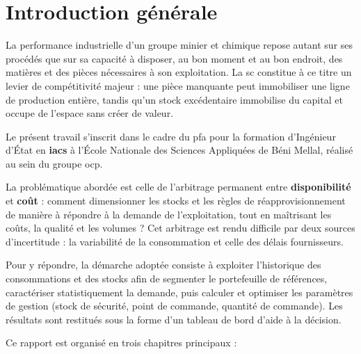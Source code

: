 \chapter*{Introduction générale}

\hspace{1cm}La performance industrielle d'un groupe minier et chimique repose
autant sur ses procédés que sur sa capacité à disposer, au bon moment et au bon
endroit, des matières et des pièces nécessaires à son exploitation. La
\gls{sc} constitue à ce titre un levier de compétitivité majeur : une pièce
manquante peut immobiliser une ligne de production entière, tandis qu'un stock
excédentaire immobilise du capital et occupe de l'espace sans créer de valeur.

\vspace{0.5cm}
Le présent travail s'inscrit dans le cadre du \gls{pfa} pour la formation
d'Ingénieur d'État en \textbf{\gls{iacs}} à l'École Nationale des Sciences
Appliquées de Béni Mellal, réalisé au sein du groupe \gls{ocp}.

\vspace{0.5cm}
La problématique abordée est celle de l'arbitrage permanent entre
\textbf{disponibilité} et \textbf{coût} : comment dimensionner les stocks et les
règles de réapprovisionnement de manière à répondre à la demande de
l'exploitation, tout en maîtrisant les coûts, la qualité et les volumes ? Cet
arbitrage est rendu difficile par deux sources d'incertitude : la variabilité de
la consommation et celle des délais fournisseurs.

\vspace{0.5cm}
Pour y répondre, la démarche adoptée consiste à exploiter l'historique des
consommations et des stocks afin de segmenter le portefeuille de références,
caractériser statistiquement la demande, puis calculer et optimiser les
paramètres de gestion (stock de sécurité, point de commande, quantité de
commande). Les résultats sont restitués sous la forme d'un tableau de bord
d'aide à la décision.

\vspace{0.5cm}
Ce rapport est organisé en trois chapitres principaux :


